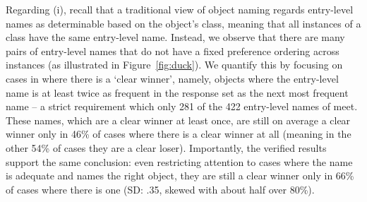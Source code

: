 Regarding (i), recall that a traditional view of object naming regards entry-level names as determinable based on the object's class, meaning that all instances of a class have the same entry-level name. 
Instead, we observe that there are many pairs of entry-level names that do not have a fixed preference ordering across instances (as illustrated in Figure~\ref{fig:duck}). 
We quantify this by focusing on cases in \mn where there is a `clear winner', namely, objects where the entry-level name is at least twice as frequent in the response set as the next most frequent name -- a strict requirement which only 281 of the 422 entry-level names of \mn meet.
These names, which are a clear winner at least once, are still on average a clear winner only in 46\% of cases where there is a clear winner at all (meaning in the other 54\% of cases they are a clear loser).
Importantly, the verified results support the same conclusion: 
even restricting attention to cases where the name is adequate and names the right object, they are still a clear winner only in 66\% of cases where there is one (SD: .35, skewed with about half over 80\%).


